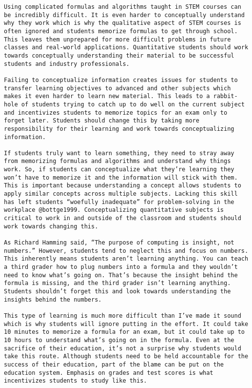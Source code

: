 \documentclass[11pt,]{article}
\begin{document}
\begin{verbatim}
Using complicated formulas and algorithms taught in STEM courses can be incredibly difficult. It is even harder to conceptually understand why they work which is why the qualitative aspect of STEM courses is often ignored and students memorize formulas to get through school. This leaves them unprepared for more difficult problems in future classes and real-world applications. Quantitative students should work towards conceptually understanding their material to be successful students and industry professionals. 

Failing to conceptualize information creates issues for students to transfer learning objectives to advanced and other subjects which makes it even harder to learn new material. This leads to a rabbit-hole of students trying to catch up to do well on the current subject and incentivizes students to memorize topics for an exam only to forget later. Students should change this by taking more responsibility for their learning and work towards conceptualizing information.

If students truly want to learn something, they need to stray away from memorizing formulas and algorithms and understand why things work. So, if students can conceptualize what they’re learning they won’t have to memorize it and the information will stick with them. This is important because understanding a concept allows students to apply similar concepts across multiple subjects. Lacking this skill has left students “woefully inadequate” for problem-solving in the workplace @bottge1999. Conceptualizing quantitative subjects is critical to work in and outside of the classroom and students should work towards changing this.

As Richard Hamming said, “The purpose of computing is insight, not numbers.” However, students tend to neglect this and focus on numbers. This inherently means students aren’t learning anything. You can teach a third grader how to plug numbers into a formula and they wouldn’t need to know what’s going on. That’s because the insight behind the formula is missing, and the third grader isn’t learning anything. Students shouldn’t forget this and look towards understanding the insights behind the numbers.

This type of learning is much more difficult than I’ve made it sound which is why students will ignore putting in the effort. It could take 10 minutes to memorize a formula for an exam, but it could take up to 10 hours to understand what’s going on in the formula. Even at the sacrifice of their education, it’s not a surprise why students would take this route. Although students need to be held accountable for the success of their education, part of the blame can be put on the education system. Emphasis on grades and test scores is what incentivizes students to study like this. 


\end{verbatim}
\end{document}
